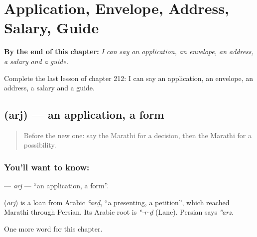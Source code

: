 
\chapter{Application, Envelope, Address, Salary, Guide}
\label{ch:mr-application-envelope-address-salary-guide}

\begin{chapteropening}
\textbf{By the end of this chapter:} \emph{I can say an application, an envelope, an address, a salary and a guide.}

Complete the last lesson of chapter 212: I can say an application, an envelope, an address, a salary and a guide.
\end{chapteropening}

\section[\texorpdfstring{\mr{अर्ज} (arj)}{अर्ज (arj)}]{ (arj) — an application, a form}

\label{lesson:MR-C212-arj}



\begin{quote}
Before the new one: say the Marathi for a decision, then the Marathi for a possibility.
\end{quote}

\subsection*{You'll want to know: }
\textbf{} — \emph{arj} — \textquotedblleft{}an application, a form\textquotedblright{}.

\begin{cousinweb}
\textbf{} (\emph{arj}) is a loan from Arabic \emph{ʿarḍ}, \textquotedblleft{}a presenting, a petition\textquotedblright{}, which reached Marathi through Persian. Its Arabic root is \emph{ʿ-r-ḍ} (Lane). Persian says \emph{ʿarz}.
\end{cousinweb}

\begin{grammarlens}[title={What you've built}]
One more word for this chapter.
\end{grammarlens}

